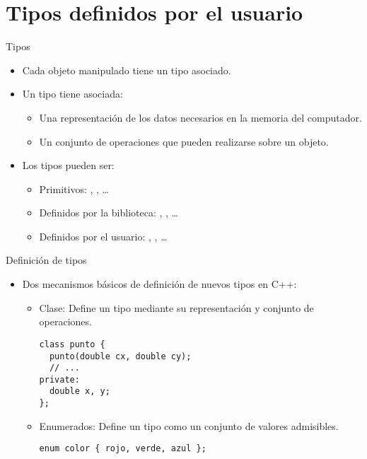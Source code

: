 \section{Tipos definidos por el usuario}

\begin{frame}[t]{Tipos}
\begin{itemize}
  \item Cada objeto manipulado tiene un tipo asociado.
  \item Un \alert{tipo} tiene asociada:
    \begin{itemize}
      \item Una \alert{representación} de los datos necesarios en la memoria del computador.
      \item Un conjunto de \alert{operaciones} que pueden realizarse sobre un objeto.
    \end{itemize}
  \item Los tipos pueden ser:
    \begin{itemize}
      \item Primitivos: , , \ldots
      \item Definidos por la biblioteca: , , \ldots
      \item Definidos por el usuario: , , \ldots
    \end{itemize}
\end{itemize}
\end{frame}

\begin{frame}[t,fragile]{Definición de tipos}
\begin{itemize}
  \item Dos mecanismos básicos de definición de nuevos tipos en C++:
    \begin{itemize}
      \item \alert{Clase}: Define un tipo mediante su representación y conjunto de operaciones.
\begin{lstlisting}
class punto {
  punto(double cx, double cy);
  // ...
private:
  double x, y;
};
\end{lstlisting}
      \item \alert{Enumerados}: Define un tipo como un conjunto de valores admisibles.
\begin{lstlisting}
enum color { rojo, verde, azul };
\end{lstlisting}
    \end{itemize}
\end{itemize}
\end{frame}
